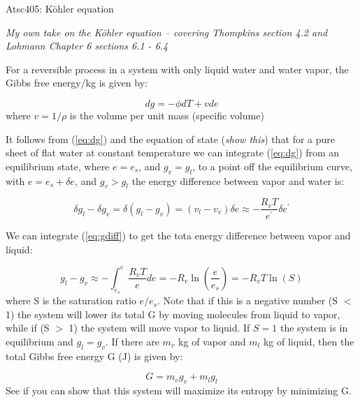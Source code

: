 \documentclass[12pt]{article}
\begin{document}
\pagestyle{first}

\begin{center}
Atsc405: K\"ohler equation\\
\end{center}


\textit{My own take on the K\"ohler equation  -- covering Thompkins section 4.2 and Lohmann Chapter 6 sections 6.1 - 6.4}

For a reversible process in a system with only liquid
water and water vapor, the Gibbs free energy/kg is given by:

\begin{equation}
  \label{eq:dg}
  dg= -\phi dT + v de
\end{equation}
where $v = 1/\rho$ is the volume per unit mass (specific volume)

It follows from (\ref{eq:dg}) and the equation of state (\textit{show
  this}) that for a pure sheet of flat water at constant temperature
we can integrate (\ref{eq:dg}) from an equilibrium state, where $e=e_s$,
and $g_v = g_l$,
to a point off the equilibrium curve, with $e=e_s + \delta e$,
and $g_v > g_l$
the energy difference between vapor and water is:

\begin{equation}
  \label{eq:gdiff}
  \delta g_l - \delta g_v = \delta (g_l - g_v) = 
( v_l - v_v ) \delta e \approx - \frac{R_v T}{e^\prime} \delta e^\prime
\end{equation}

We can integrate (\ref{eq:gdiff}) to get the tota energy difference
between vapor and liquid:

\begin{equation}
  \label{eq:totdiff}
  g_l - g_v \approx - \int_{e_s}^e \frac{R_v T}{e} de
= -R_v \ln \left ( \frac{ e}{e_s}  \right ) = -R_v T \ln (S)
\end{equation}
where S is the saturation ratio $e/e_s$.  Note that  if this is a
negative number (S $<$ 1) the system will lower its total G by moving
molecules from liquid to vapor, while if (S $>$ 1) the system will
move vapor to liquid.  If $S=1$ the system is in equilibrium and $g_l=
g_v$.  If there are $m_v$ kg of vapor and $m_l$ kg of liquid, then the
total Gibbs free energy G (J) is given by:

\begin{equation}
  \label{eq:total}
  G= m_v g_v + m_l g_l
\end{equation}
See if you can show that  this system will
maximize its entropy by minimizing G.
\end{document}
